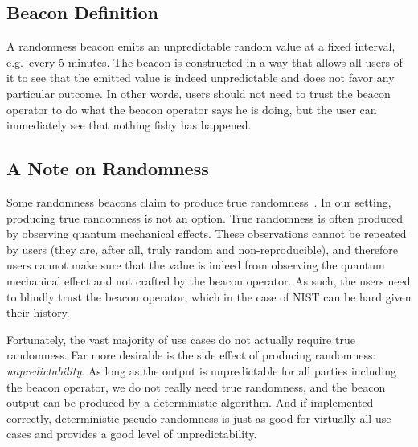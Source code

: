 


\subsection{Beacon Definition}

A randomness beacon emits an unpredictable random value at a fixed interval, e.g.\ every 5 minutes.
The beacon is constructed in a way that allows all users of it to see that the emitted value is indeed unpredictable and does not favor any particular outcome.
In other words, users should not need to trust the beacon operator to do what the beacon operator says he is doing, but the user can immediately see that nothing fishy has happened.

\subsection{A Note on Randomness}
Some randomness beacons claim to produce true randomness~\cite{nistbeacon}.
In our setting, producing true randomness is not an option.
True randomness is often produced by observing quantum mechanical effects.
These observations cannot be repeated by users (they are, after all, truly random and non-reproducible), and therefore users cannot make sure that the value is indeed from observing the quantum mechanical effect and not crafted by the beacon operator.
As such, the users need to blindly trust the beacon operator, which in the case of NIST can be hard given their history\cite{nytimes-nsabackdoors, nytimes-nsaconstants, nist2014backdoor}.

Fortunately, the vast majority of use cases do not actually require true randomness.
Far more desirable is the side effect of producing randomness: \emph{unpredictability}.
As long as the output is unpredictable for all parties including the beacon operator, we do not really need true randomness, and the beacon output can be produced by a deterministic algorithm.
And if implemented correctly, deterministic pseudo-randomness is just as good for virtually all use cases and provides a good level of unpredictability.

